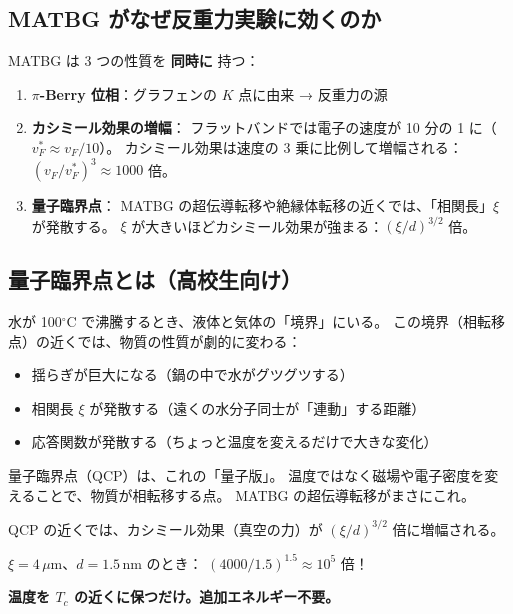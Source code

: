 \documentclass[11pt,a4paper]{article}
\begin{document}
\subsection{MATBG がなぜ反重力実験に効くのか}

MATBG は 3 つの性質を \textbf{同時に} 持つ：

\begin{enumerate}
\item \textbf{$\pi$-Berry 位相}：グラフェンの $K$ 点に由来 → 反重力の源

\item \textbf{カシミール効果の増幅}：
フラットバンドでは電子の速度が 10 分の 1 に（$v_F^* \approx v_F/10$）。
カシミール効果は速度の 3 乗に比例して増幅される：
$(v_F/v_F^*)^3 \approx 1000$ 倍。

\item \textbf{量子臨界点}：
MATBG の超伝導転移や絶縁体転移の近くでは、「相関長」$\xi$ が発散する。
$\xi$ が大きいほどカシミール効果が強まる：$(\xi/d)^{3/2}$ 倍。
\end{enumerate}

\subsection{量子臨界点とは（高校生向け）}

水が 100$^\circ$C で沸騰するとき、液体と気体の「境界」にいる。
この境界（相転移点）の近くでは、物質の性質が劇的に変わる：
\begin{itemize}
\item 揺らぎが巨大になる（鍋の中で水がグツグツする）
\item 相関長 $\xi$ が発散する（遠くの水分子同士が「連動」する距離）
\item 応答関数が発散する（ちょっと温度を変えるだけで大きな変化）
\end{itemize}

量子臨界点（QCP）は、これの「量子版」。
温度ではなく磁場や電子密度を変えることで、物質が相転移する点。
MATBG の超伝導転移がまさにこれ。

\begin{tcolorbox}[colback=red!5,colframe=red!50!black,title=QCP の威力]
QCP の近くでは、カシミール効果（真空の力）が
$(\xi/d)^{3/2}$ 倍に増幅される。

$\xi = 4\,\mu$m、$d = 1.5$\,nm のとき：
$(4000/1.5)^{1.5} \approx 10^5$ 倍！

\textbf{温度を $T_c$ の近くに保つだけ。追加エネルギー不要。}
\end{tcolorbox}
\end{document}
